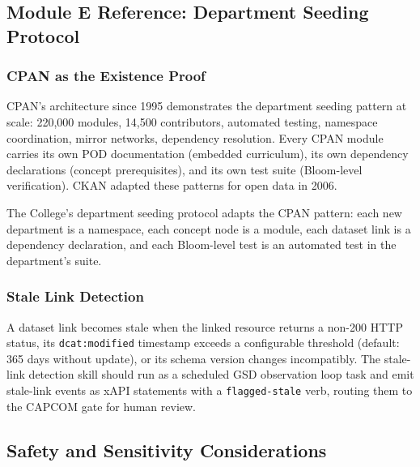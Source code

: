\documentclass[11pt,letterpaper]{article}
\begin{document}
\subsection{Module E Reference: Department Seeding Protocol}

\subsubsection{CPAN as the Existence Proof}

CPAN's architecture since 1995 demonstrates the department seeding pattern at scale: 220,000 modules, 14,500 contributors, automated testing, namespace coordination, mirror networks, dependency resolution. Every CPAN module carries its own POD documentation (embedded curriculum), its own dependency declarations (concept prerequisites), and its own test suite (Bloom-level verification). CKAN adapted these patterns for open data in 2006.

The College's department seeding protocol adapts the CPAN pattern: each new department is a namespace, each concept node is a module, each dataset link is a dependency declaration, and each Bloom-level test is an automated test in the department's suite.

\subsubsection{Stale Link Detection}

A dataset link becomes stale when the linked resource returns a non-200 HTTP status, its \texttt{dcat:modified} timestamp exceeds a configurable threshold (default: 365 days without update), or its schema version changes incompatibly. The stale-link detection skill should run as a scheduled GSD observation loop task and emit stale-link events as xAPI statements with a \texttt{flagged-stale} verb, routing them to the CAPCOM gate for human review.

\subsection{Safety and Sensitivity Considerations}
\end{document}
